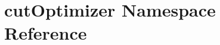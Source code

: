 \hypertarget{namespacecutOptimizer}{
\section{cutOptimizer Namespace Reference}
\label{namespacecutOptimizer}
}
